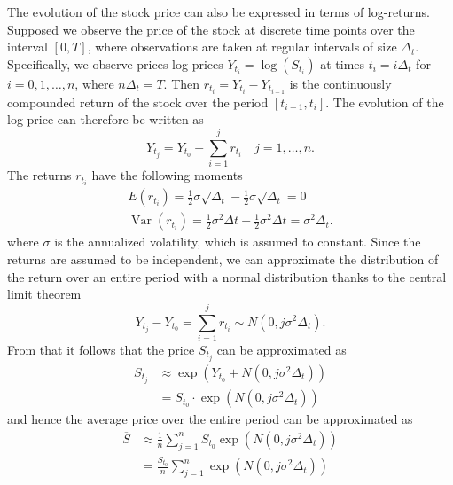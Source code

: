 \documentclass[a4paper, 12pt]{article}
\begin{document}
The evolution of the stock price can also be
expressed in terms of log-returns. Supposed we
observe the price of the stock at discrete time
points over the interval $[0, T]$, where
observations are taken at regular intervals of
size $\Delta_t$. Specifically, we observe prices log
prices $Y_{t_i} = \log(S_{t_i})$ at
times $t_i = i\Delta_t$ for $i = 0, 1, \dots, n$,
where $n\Delta_t = T$. Then $r_{t_i} = Y_{t_i} -
Y_{t_{i-1}}$ is the continuously compounded return
of the stock over the period $[t_{i-1}, t_i]$. The
evolution of the log price can therefore be
written as
\begin{equation}
  Y_{t_j} = Y_{t_0} + \sum^{j}_{i=1} r_{t_i} \quad
  j = 1, \dots, n.
\end{equation}
The returns $r_{t_i}$ have the following moments
\begin{equation}
\begin{gathered}
  E(r_{t_i}) = \frac{1}{2} \sigma \sqrt{\Delta_t}
  - \frac{1}{2} \sigma \sqrt{\Delta_t} = 0 \\
  \operatorname{Var}\left( r_{t_i}\right)=\frac{1}{2} \sigma^2 \Delta t+\frac{1}{2} \sigma^2 \Delta t=\sigma^2 \Delta_t .
\end{gathered}
\end{equation}
where $\sigma$ is the annualized volatility, which
is assumed to constant. Since the returns are
assumed to be independent, we can approximate the
distribution of the return over an entire period
with a normal distribution thanks to the central
limit theorem
\begin{equation}
  Y_{t_j} - Y_{t_0} = \sum^{j}_{i=1} r_{t_i}
  \sim N(0, j \sigma^2 \Delta_t).
\end{equation}
From that it follows that the price $S_{t_j}$ can
be approximated as
\begin{equation}
\begin{aligned}
  S_{t_j} &\approx \exp(Y_{t_0} + N(0, j\sigma^2 \Delta_t)) \\
  &= S_{t_0} \cdot \exp(N(0, j\sigma^2 \Delta_t))
\end{aligned}
\end{equation}
and hence the average price over the entire period
can be approximated as
\begin{equation}
\begin{aligned}
  \overline S &\approx \frac{1}{n} \sum^{n}_{j=1} S_{t_0}
  \exp(N(0, j\sigma^2\Delta_t)) \\
  &= \frac{S_{t_0}}{n} \sum^{n}_{j=1} \exp(N(0, j\sigma^2\Delta_t))
\end{aligned}
\end{equation}
\end{document}
